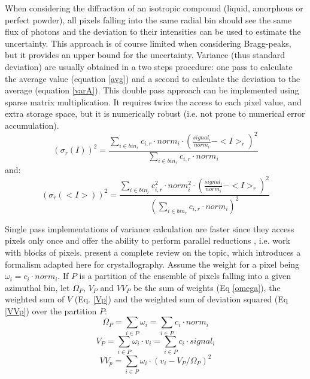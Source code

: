 \documentclass[preprint]{iucr}              %
\begin{document}
When considering the diffraction of an isotropic compound (liquid, amorphous or perfect powder), all pixels falling into the same radial bin should see the same flux of photons and the deviation to their intensities can be used to estimate the uncertainty. 
This approach is of course limited when considering Bragg-peaks, but it provides an upper bound for the uncertainty.
Variance (thus standard deviation) are usually obtained in a two steps procedure: one pass to calculate the average value (equation \ref{avg}) and a second to calculate the deviation to the average (equation \ref{varA}). 
This double pass approach can be implemented using sparse matrix multiplication. 
It requires twice the access to each pixel value, and extra storage space, but it is numerically robust (i.e. not prone to numerical error accumulation).
\begin{equation}
\label{varA}
    (\sigma_{r}(I))^2 = \frac {\sum\limits_{i \in bin_r} c_{i,r} \cdot norm_i \cdot (\frac{signal_i}{norm_i}-<I>_r)^2}
                              {\sum\limits_{i \in bin_r} c_{i,r} \cdot norm_i}
\end{equation}
and:
\begin{equation}
\label{varB}
(\sigma_{r}(<I>))^2 = \frac{\sum\limits_{i \in bin_r} c_{i,r}^2 \cdot norm_i^2 \cdot (\frac{signal_i}{norm_i}-<I>_r)^2}
                         {(\sum\limits_{i \in bin_r} c_{i,r} \cdot norm_i)^2}  
\end{equation}


Single pass implementations of variance calculation are faster since they access pixels only once and offer the ability to perform parallel reductions \cite{Blelloch}, i.e. work with blocks of pixels.
 present a complete review on the topic, which introduces a formalism adapted here for crystallography.
Assume the weight for a pixel being $\omega_i = c_i \cdot norm_i$.
If $P$ is a partition of the ensemble of pixels falling into a given azimuthal bin, let $\Omega_{P}$, $V_{P}$ and $VV_{P}$  
be the sum of weights (Eq \ref{omega}), the weighted sum of $V$ (Eq. \ref{Vp}) and the weighted sum of deviation squared (Eq \ref{VVp}) over the partition $P$: 
\begin{equation}
\label{omega}
\Omega_{P} = \sum\limits_{i \in P} \omega_i = \sum\limits_{i \in P} c_i \cdot norm_i 
\end{equation}
\begin{equation}
\label{Vp}
V_{P} = \sum\limits_{i \in P} \omega_i \cdot v_i =  \sum\limits_{i \in P} c_i \cdot signal_i
\end{equation}
\begin{equation}
\label{VVp}
VV_{p} = \sum\limits_{i \in P} \omega_i \cdot (v_i - V_{P}/\Omega_{P})^2 
\end{equation}
\end{document}
